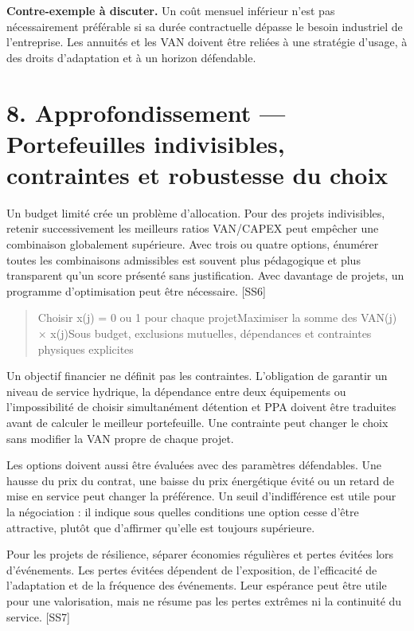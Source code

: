 \documentclass[12pt,a4paper]{article}
\begin{document}
\textbf{Contre-exemple à discuter.} Un coût mensuel inférieur n’est pas nécessairement préférable si sa durée contractuelle dépasse le besoin industriel de l’entreprise. Les annuités et les VAN doivent être reliées à une stratégie d’usage, à des droits d’adaptation et à un horizon défendable.

\section*{8. Approfondissement --- Portefeuilles indivisibles, contraintes et robustesse du choix}
Un budget limité crée un problème d’allocation. Pour des projets indivisibles, retenir successivement les meilleurs ratios VAN/CAPEX peut empêcher une combinaison globalement supérieure. Avec trois ou quatre options, énumérer toutes les combinaisons admissibles est souvent plus pédagogique et plus transparent qu’un score présenté sans justification. Avec davantage de projets, un programme d’optimisation peut être nécessaire. [SS6]



\begin{quote}\small Choisir x(j) = 0 ou 1 pour chaque projet\newline Maximiser la somme des VAN(j) $\times$ x(j)\newline Sous budget, exclusions mutuelles, dépendances et contraintes physiques explicites\end{quote}

Un objectif financier ne définit pas les contraintes. L’obligation de garantir un niveau de service hydrique, la dépendance entre deux équipements ou l’impossibilité de choisir simultanément détention et PPA doivent être traduites avant de calculer le meilleur portefeuille. Une contrainte peut changer le choix sans modifier la VAN propre de chaque projet.


Les options doivent aussi être évaluées avec des paramètres défendables. Une hausse du prix du contrat, une baisse du prix énergétique évité ou un retard de mise en service peut changer la préférence. Un seuil d’indifférence est utile pour la négociation : il indique sous quelles conditions une option cesse d’être attractive, plutôt que d’affirmer qu’elle est toujours supérieure.


Pour les projets de résilience, séparer économies régulières et pertes évitées lors d’événements. Les pertes évitées dépendent de l’exposition, de l’efficacité de l’adaptation et de la fréquence des événements. Leur espérance peut être utile pour une valorisation, mais ne résume pas les pertes extrêmes ni la continuité du service. [SS7]
\end{document}
